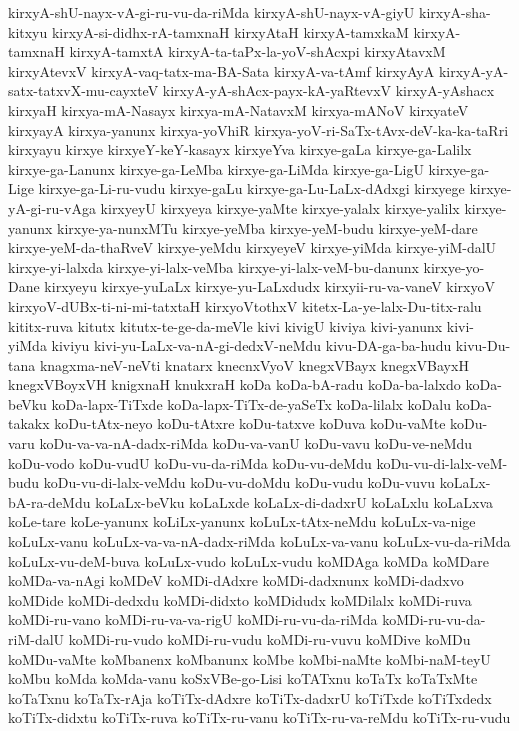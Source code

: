 {kirxyA-shU-nayx-vA-gi-ru-vu-da-riMda
kirxyA-shU-nayx-vA-giyU
kirxyA-sha-kitxyu
kirxyA-si-didhx-rA-tamxnaH
kirxyAtaH
kirxyA-tamxkaM
kirxyA-tamxnaH
kirxyA-tamxtA
kirxyA-ta-taPx-la-yoV-shAcxpi
kirxyAtavxM
kirxyAtevxV
kirxyA-vaq-tatx-ma-BA-Sata
kirxyA-va-tAmf
kirxyAyA
kirxyA-yA-satx-tatxvX-mu-cayxteV
kirxyA-yA-shAcx-payx-kA-yaRtevxV
kirxyA-yAshacx
kirxyaH
kirxya-mA-Nasayx
kirxya-mA-NatavxM
kirxya-mANoV
kirxyateV
kirxyayA
kirxya-yanunx
kirxya-yoVhiR
kirxya-yoV-ri-SaTx-tAvx-deV-ka-ka-taRri
kirxyayu
kirxye
kirxyeY-keY-kasayx
kirxyeYva
kirxye-gaLa
kirxye-ga-Lalilx
kirxye-ga-Lanunx
kirxye-ga-LeMba
kirxye-ga-LiMda
kirxye-ga-LigU
kirxye-ga-Lige
kirxye-ga-Li-ru-vudu
kirxye-gaLu
kirxye-ga-Lu-LaLx-dAdxgi
kirxyege
kirxye-yA-gi-ru-vAga
kirxyeyU
kirxyeya
kirxye-yaMte
kirxye-yalalx
kirxye-yalilx
kirxye-yanunx
kirxye-ya-nunxMTu
kirxye-yeMba
kirxye-yeM-budu
kirxye-yeM-dare
kirxye-yeM-da-thaRveV
kirxye-yeMdu
kirxyeyeV
kirxye-yiMda
kirxye-yiM-dalU
kirxye-yi-lalxda
kirxye-yi-lalx-veMba
kirxye-yi-lalx-veM-bu-danunx
kirxye-yo-Dane
kirxyeyu
kirxye-yuLaLx
kirxye-yu-LaLxdudx
kirxyii-ru-va-vaneV
kirxyoV
kirxyoV-dUBx-ti-ni-mi-tatxtaH
kirxyoVtothxV
kitetx-La-ye-lalx-Du-titx-ralu
kititx-ruva
kitutx
kitutx-te-ge-da-meVle
kivi
kivigU
kiviya
kivi-yanunx
kivi-yiMda
kiviyu
kivi-yu-LaLx-va-nA-gi-dedxV-neMdu
kivu-DA-ga-ba-hudu
kivu-Du-tana
knagxma-neV-neVti
knatarx
knecnxVyoV
knegxVBayx
knegxVBayxH
knegxVBoyxVH
knigxnaH
knukxraH
koDa
koDa-bA-radu
koDa-ba-lalxdo
koDa-beVku
koDa-lapx-TiTxde
koDa-lapx-TiTx-de-yaSeTx
koDa-lilalx
koDalu
koDa-takakx
koDu-tAtx-neyo
koDu-tAtxre
koDu-tatxve
koDuva
koDu-vaMte
koDu-varu
koDu-va-va-nA-dadx-riMda
koDu-va-vanU
koDu-vavu
koDu-ve-neMdu
koDu-vodo
koDu-vudU
koDu-vu-da-riMda
koDu-vu-deMdu
koDu-vu-di-lalx-veM-budu
koDu-vu-di-lalx-veMdu
koDu-vu-doMdu
koDu-vudu
koDu-vuvu
koLaLx-bA-ra-deMdu
koLaLx-beVku
koLaLxde
koLaLx-di-dadxrU
koLaLxlu
koLaLxva
koLe-tare
koLe-yanunx
koLiLx-yanunx
koLuLx-tAtx-neMdu
koLuLx-va-nige
koLuLx-vanu
koLuLx-va-va-nA-dadx-riMda
koLuLx-va-vanu
koLuLx-vu-da-riMda
koLuLx-vu-deM-buva
koLuLx-vudo
koLuLx-vudu
koMDAga
koMDa
koMDare
koMDa-va-nAgi
koMDeV
koMDi-dAdxre
koMDi-dadxnunx
koMDi-dadxvo
koMDide
koMDi-dedxdu
koMDi-didxto
koMDidudx
koMDilalx
koMDi-ruva
koMDi-ru-vano
koMDi-ru-va-va-rigU
koMDi-ru-vu-da-riMda
koMDi-ru-vu-da-riM-dalU
koMDi-ru-vudo
koMDi-ru-vudu
koMDi-ru-vuvu
koMDive
koMDu
koMDu-vaMte
koMbanenx
koMbanunx
koMbe
koMbi-naMte
koMbi-naM-teyU
koMbu
koMda
koMda-vanu
koSxVBe-go-Lisi
koTATxnu
koTaTx
koTaTxMte
koTaTxnu
koTaTx-rAja
koTiTx-dAdxre
koTiTx-dadxrU
koTiTxde
koTiTxdedx
koTiTx-didxtu
koTiTx-ruva
koTiTx-ru-vanu
koTiTx-ru-va-reMdu
koTiTx-ru-vudu
}
